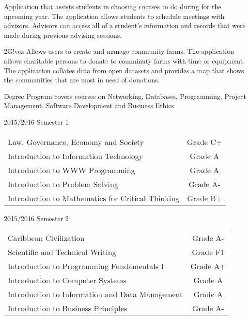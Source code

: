 \documentclass[10pt,a4paper,normalphoto]{altacv}
\begin{document}
\divider

Application that assists students in choosing courses to do during for the upcoming year. The application allows 
students to schedule meetings with advisors. Advisors can access all of a student's information and records that were made
during previous advising sessions.\\

\divider

2G!vez Allows users to create and manage community farms. The application allows charitable persons to donate to comminuty farms with time or equipment. The application collates data from open datasets and provides a map that shows the communities that are most in need of donations.\\
\medskip

\clearpage



Degree Program covers courses on Networking, Databases, Programming, Project Management, Software Development and Business Ethics

\medskip

2015/2016 Semester 1

\medskip
\begin{tabular}{ l c }
Law, Governance, Economy and Society &  Grade C+\\
Introduction to Information Technology  & Grade A\\
Introduction to WWW Programming & Grade A\\
Introduction to Problem Solving & Grade A-\\
Introduction to Mathematics for Critical Thinking & Grade B+
\end{tabular}

\divider

2015/2016 Semester 2

\medskip
\begin{tabular}{ l c }
Caribbean Civilization &  Grade A-\\
Scientific and Technical Writing  & Grade F1\\
Introduction to Programming Fundamentals I & Grade A+\\
Introduction to Computer Systems & Grade A\\
Introduction to Information and Data Management & Grade A\\
Introduction to Business Principles & Grade A-
\end{tabular}
\end{document}
